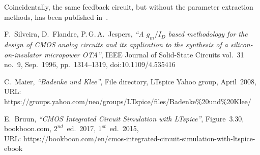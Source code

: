 \documentclass[journal]{IEEEtran}
\begin{document}
Coincidentally, the same feedback circuit, but without the parameter extraction methods, 
has been published in~\cite{Bruun2017}.

\begin{thebibliography}{1}
F.~Silveira, D.~Flandre, P.\,G.\,A.~Jespers,
\textsl{``A $g_m/I_D$ based methodology for the design of CMOS analog circuits and its application to the synthesis of a silicon-on-insulator micropower OTA''},
IEEE Journal of Solid-State Circuits vol.~31 no.~9, Sep.~1996, pp.~1314--1319,
doi:10.1109/4.535416

C.~Maier, \textsl{``Badenke und Klee''}, File directory, LTspice Yahoo group, April~2008,\\
URL: \textsf{https://groups.yahoo.com/neo/groups/LTspice/files/Badenke\%20und\%20Klee/}

E.~Bruun, \textsl{``CMOS Integrated Circuit Simulation with LTspice''}, Figure~3.30, 
bookboon.com, $2^{nd}$~ed.~2017, $1^{st}$~ed.~2015,\\
URL: \textsf{https://bookboon.com/en/cmos-integrated-circuit-simulation-with-ltspice-ebook}
\end{thebibliography}
\end{document}
